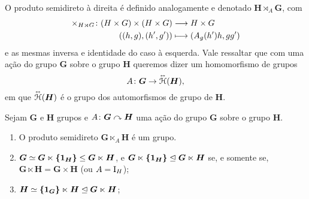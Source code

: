 O produto semidireto à direita é definido analogamente e denotado $\bm H \rtimes_A \bm G$, com
	\begin{align*}
		{\times_{H \rtimes G}}\colon {(H \times G) \times (H \times G)} &\longrightarrow {H \times G} \\{((h,g),(h',g'))} &\longmapsto (A_g(h')h,gg')
	\end{align*}
e as mesmas inversa e identidade do caso à esquerda. Vale ressaltar que com uma ação do grupo $\bm G$ sobre o grupo $\bm H$ queremos dizer um homomorfismo de grupos
	\begin{equation*}
		A\colon \bm G \to \accentset{\leftrightarrow}{\mathcal{H}}(\bm H),
	\end{equation*}
em que $\accentset{\leftrightarrow}{\mathcal{H}}(\bm H)$ é o grupo dos automorfismos de grupo de $\bm H$.


\begin{exercise}
Sejam $\bm G$ e $\bm H$ grupos e $A\colon \bm G \curvearrowright \bm H$ uma ação do grupo $\bm G$ sobre o grupo $\bm H$.
	\begin{enumerate}
		\item O produto semidireto $\bm G \ltimes_A \bm H$ é um grupo.
		
		\item $\bm G \simeq \bm G \ltimes \bm{\{1_H\}} \leq \bm G \ltimes \bm H$, e $\bm G \ltimes \bm{\{1_H\}} \mathrel{\unlhd} \bm G \ltimes \bm H$ se, e somente se, $\bm G \ltimes \bm H = \bm G \times \bm H$ (ou $A=\mathrm{I}_H$);
		
		\item $\bm H \simeq \bm{\{1_G\}} \ltimes \bm H \mathrel{\unlhd} \bm G \ltimes \bm H$;
	\end{enumerate}
\end{exercise}

